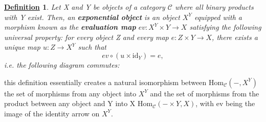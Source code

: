 \documentclass{article}
\newtheorem*{def*}{\underline{Definition}}
\begin{document}
\begin{def*}
	Let X and Y be objects of a category \(\mathcal{C}\) where all binary products with Y exist. Then, an \textbf{exponential object} is an object \(X^{Y}\) equipped with a morphism known as the \textbf{evaluation map} \(ev:X^{Y}\times Y\rightarrow X\) satisfying the following universal property: for every object Z and every map \(e:Z\times Y\rightarrow X\), there exists a unique map \(u:Z\rightarrow X^{Y}\) such that
	\[
		ev\circ (u\times \mathrm{id}_{Y}) = e,
	\]
	\textit{i.e.} the following diagram commutes:
	\begin{center}
	\end{center}
\end{def*}
this definition essentially creates a natural isomorphism between \(\mathrm{Hom}_{\mathcal{C}}(-, X^{Y})\) the set of morphisms from any object into \(X^{Y}\) and the set of morphisms from the product between any object and Y into X \(\mathrm{Hom}_{\mathcal{C}}(-\times Y, X)\), with ev being the image of the identity arrow on \(X^{Y}\).
\end{document}
